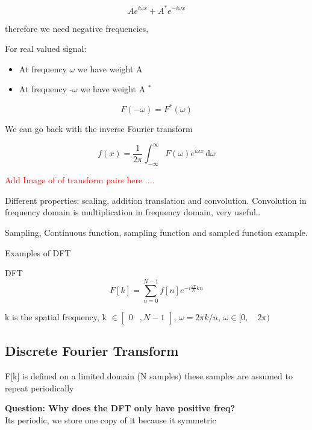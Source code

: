 \begin{equation}
Ae^{i\omega x} + A^{*}e^{-i\omega x}
\end{equation}

therefore we need negative frequencies, 

\begin{example}{}
For real valued signal:
\begin{itemize}
	\item At frequency $\omega$ we have weight A
	\item At frequency -$\omega$ we have weight A $^{*}$	
\end{itemize}
\begin{equation}
F(-\omega) = F^{*}(\omega)
\end{equation}
\end{example}	


We can go back with the inverse Fourier transform

\begin{equation}
f(x) = \frac{1} {2\pi} \int_{-\infty}^{\infty} F(\omega) e^{i\omega x} \,\text{d}\omega 
\end{equation}

\textcolor{red}{Add Image of of transform pairs here ....}  

Different properties: scaling, addition translation and convolution. Convolution in frequency domain is multiplication in frequency domain, very useful.. 


Sampling, Continuous function, sampling function and sampled function example. 

Examples of DFT

DFT
\begin{equation}
F[k] = \sum_{n=0}^{N-1} f[n] e^{-i \frac{2\pi} {N}kn } 
\end{equation}

k is the spatial frequency, k $\in \begin{bmatrix} 0&, N-1 \end{bmatrix}$, $\omega = 2 \pi k / n$, $ \omega \in  [0, \quad 2\pi ) $

\subsection*{Discrete Fourier Transform}
F[k] is defined on a limited domain (N samples) these samples are assumed to repeat periodically



\textbf{Question: Why does the DFT only have positive freq?}\\
Its periodic, we store one copy of it because it symmetric  



